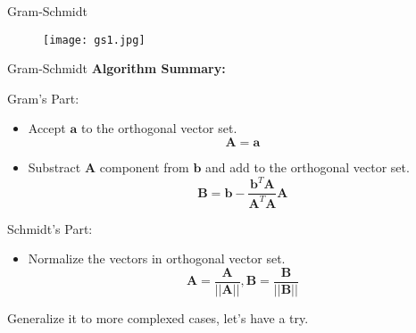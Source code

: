 \documentclass{beamer}
\begin{document}
\begin{frame}{Gram-Schmidt}
\begin{figure}
    \centering
    \texttt{[image: gs1.jpg]}
\end{figure}
\end{frame}

\begin{frame}{Gram-Schmidt}
\textbf{Algorithm Summary:}

\vspace{3pt}
Gram's Part:
\begin{itemize}
    \item Accept $\mathbf{a}$ to the orthogonal vector set.
    \begin{equation*}
        \mathbf{A}=\mathbf{a}
    \end{equation*}
    \item Substract $\mathbf{A}$ component from $\mathbf{b}$ and add to the orthogonal vector set.
    \begin{equation*}
        \mathbf{B}=\mathbf{b}-\frac{\mathbf{b}^T\mathbf{A}}{\mathbf{A}^T\mathbf{A}}\mathbf{A}
    \end{equation*}
\end{itemize}

Schmidt's Part:
\begin{itemize}
    \item Normalize the vectors in orthogonal vector set.
    \begin{equation*}
        \mathbf{A}=\frac{\mathbf{A}}{||\mathbf{A}||}, \mathbf{B}=\frac{\mathbf{B}}{||\mathbf{B}||}
    \end{equation*}
\end{itemize}

Generalize it to more complexed cases, let's have a try.
\end{frame}
\end{document}

